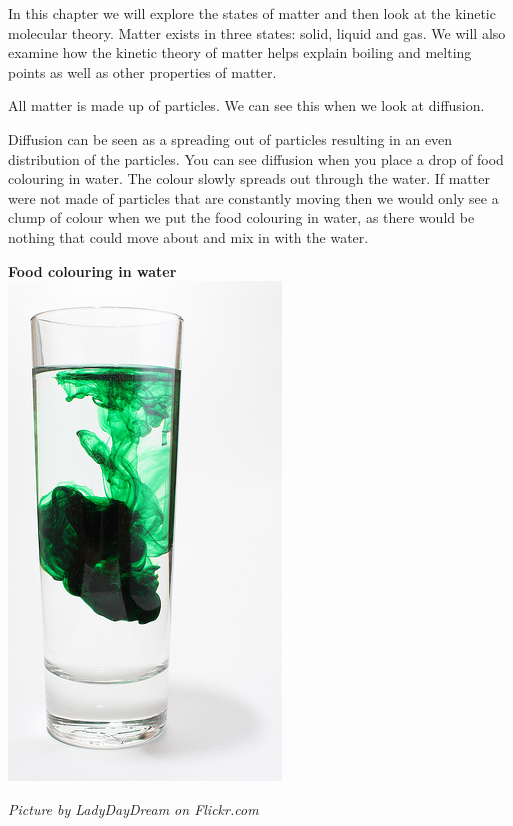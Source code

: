 \label{m38736*id802341}In this chapter we will explore the states of matter and then look at the kinetic molecular theory. Matter exists in three states: solid, liquid and gas. We will also examine how the kinetic theory of matter helps explain boiling and melting points as well as other properties of matter.\par 
{}
\label{m38736*id324876121}All matter is made up of particles. We can see this when we look at diffusion. \par
{} 
\begin{minipage}{.5\textwidth}
Diffusion can be seen as a spreading out of particles resulting in an even distribution of the particles. You can see diffusion when you place a drop of food colouring in water. The colour slowly spreads out through the water. If matter were not made of particles that are constantly moving then we would only see a clump of colour when we put the food colouring in water, as there would be nothing that could move about and mix in with the water.
\end{minipage}
\begin{minipage}{.5\textwidth}
\begin{center}
\textbf{Food colouring in water}\\
 \includegraphics[height=.5\textwidth]{photos/diffusionby-LadyDayDream-flickr.jpg}\par
\textit{Picture by LadyDayDream on Flickr.com}
\end{center}
\end{minipage}


